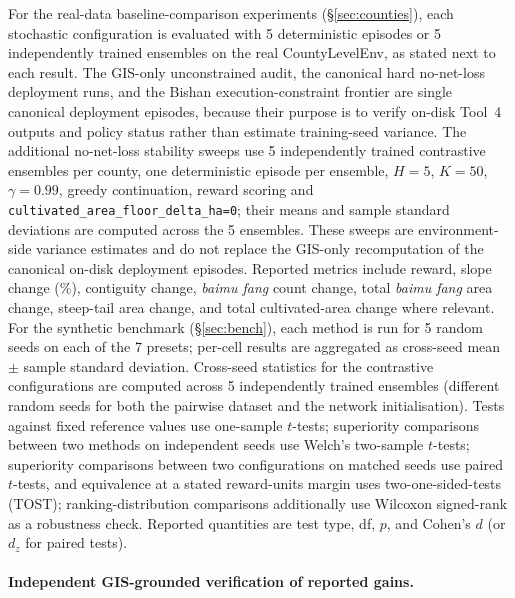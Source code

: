 \documentclass[11pt]{article}
\begin{document}
For the real-data baseline-comparison experiments (\S\ref{sec:counties}), each stochastic configuration is evaluated with 5 deterministic episodes or 5 independently trained ensembles on the real CountyLevelEnv, as stated next to each result. The GIS-only unconstrained audit, the canonical hard no-net-loss deployment runs, and the Bishan execution-constraint frontier are single canonical deployment episodes, because their purpose is to verify on-disk Tool~4 outputs and policy status rather than estimate training-seed variance. The additional no-net-loss stability sweeps use 5 independently trained contrastive ensembles per county, one deterministic episode per ensemble, $H{=}5$, $K{=}50$, $\gamma{=}0.99$, greedy continuation, reward scoring and \texttt{cultivated\_area\_floor\_delta\_ha=0}; their means and sample standard deviations are computed across the 5 ensembles. These sweeps are environment-side variance estimates and do not replace the GIS-only recomputation of the canonical on-disk deployment episodes. Reported metrics include reward, slope change ($\%$), contiguity change, \textit{baimu fang} count change, total \textit{baimu fang} area change, steep-tail area change, and total cultivated-area change where relevant. For the synthetic benchmark (\S\ref{sec:bench}), each method is run for 5 random seeds on each of the 7 presets; per-cell results are aggregated as cross-seed mean $\pm$ sample standard deviation. Cross-seed statistics for the contrastive configurations are computed across 5 independently trained ensembles (different random seeds for both the pairwise dataset and the network initialisation). Tests against fixed reference values use one-sample $t$-tests; superiority comparisons between two methods on independent seeds use Welch's two-sample $t$-tests; superiority comparisons between two configurations on matched seeds use paired $t$-tests, and equivalence at a stated reward-units margin uses two-one-sided-tests (TOST); ranking-distribution comparisons additionally use Wilcoxon signed-rank as a robustness check. Reported quantities are test type, df, $p$, and Cohen's $d$ (or $d_z$ for paired tests).

\paragraph{Independent GIS-grounded verification of reported gains.}\label{sec:methods-validate}
\end{document}
